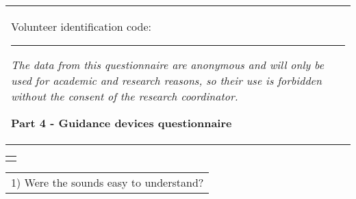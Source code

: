 %
%
%
\begin{table}[!thb]
    \begin{tabular}{m{1\linewidth}}

        {\color{gray}

        Volunteer identification code: \rule{1in}{.2mm}
        
        \textit{The data from this questionnaire are anonymous and will only be used for academic and research reasons, so their use is forbidden without the consent of the research coordinator.}
        }
        
        \begin{center}
        \textbf{Part 4 - Guidance devices questionnaire}
        \end{center}
        
    \end{tabular}
%
    \begin{tabular}{>{\centering\arraybackslash}m{1\linewidth}}
        {\large TEST 1 - AUDIO GUIDANCE}
    \end{tabular}
    \vfill
    \begin{tabular}{m{1\linewidth}}
        \vspace{1ex}
        1)	Were the sounds easy to understand?
    \end{tabular}
        
        


\end{table}
